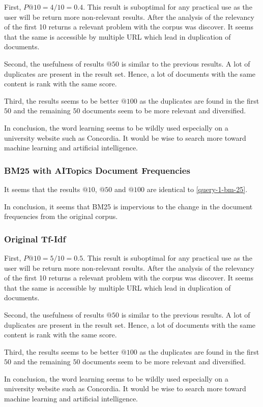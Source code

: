 \par First, $P@10=4/10=0.4$. This result is suboptimal for any practical use as the user will be return more non-relevant results. After the analysis of the relevancy of the first 10 returns a relevant problem with the corpus was discover. It seems that the same is accessible by multiple URL which lead in duplication of documents.
\par Second, the usefulness of results $@50$ is similar to the previous results. A lot of duplicates are present in the result set. Hence, a lot of documents with the same content is rank with the same score.
\par Third, the results seems to be better $@100$ as the duplicates are found in the first $50$ and the remaining $50$ documents seem to be more relevant and diversified.
\par In conclusion, the word learning seems to be wildly used especially on a university website such as Concordia. It would be wise to search more toward machine learning and artificial intelligence.

\subsubsection{BM25 with AITopics Document Frequencies}\label{query-1-bm-25-aitopics}

\par It seems that the results $@10$, $@50$ and $@100$ are identical to \ref{query-1-bm-25}.
\par In conclusion, it seems that BM25 is impervious to the change in the document frequencies from the original corpus.

\subsubsection{Original Tf-Idf}\label{query-1-tf-idf}

\par First, $P@10=5/10=0.5$. This result is suboptimal for any practical use as the user will be return more non-relevant results. After the analysis of the relevancy of the first 10 returns a relevant problem with the corpus was discover. It seems that the same is accessible by multiple URL which lead in duplication of documents.
\par Second, the usefulness of results $@50$ is similar to the previous results. A lot of duplicates are present in the result set. Hence, a lot of documents with the same content is rank with the same score.
\par Third, the results seems to be better $@100$ as the duplicates are found in the first $50$ and the remaining $50$ documents seem to be more relevant and diversified.
\par In conclusion, the word learning seems to be wildly used especially on a university website such as Concordia. It would be wise to search more toward machine learning and artificial intelligence.

